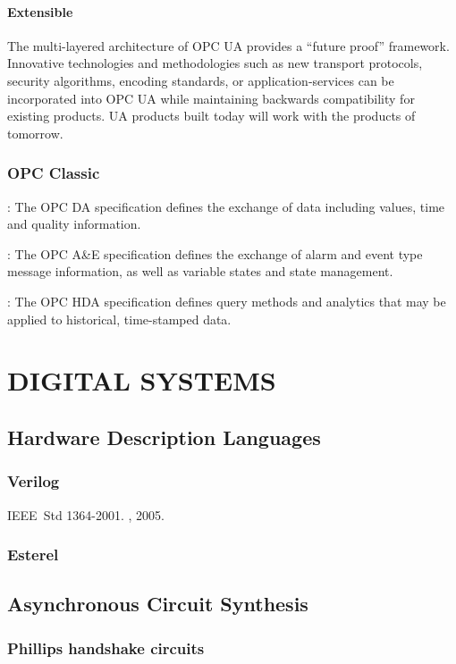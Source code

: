 \documentclass{myproc}
\begin{document}
\paragraph{Extensible}
The multi-layered architecture of OPC UA provides a ``future proof''
framework. Innovative technologies and methodologies such as new transport
protocols, security algorithms, encoding standards, or application-services
can be incorporated into OPC UA while maintaining backwards compatibility for
existing products. UA products built today will work with the products of
tomorrow. 

\subsubsection{OPC Classic}
\bit
\w {}:
The OPC DA specification defines the exchange of data including values, time and quality information.

\w {}:
The OPC A\&E specification defines the exchange of alarm and event type message
information, as well as variable states and state management. 

\w {}:
The OPC HDA specification defines query methods and analytics that may be
applied to historical, time-stamped data.
\eit


\section{DIGITAL SYSTEMS}
\subsection{Hardware Description Languages}
\subsubsection{Verilog}
\bit
\w IEEE~Std 1364-2001.
, 2005.
\eit
\subsubsection{Esterel}

\subsection{\textcolor{red2}{\bf{}Asynchronous Circuit Synthesis}}
\subsubsection{Phillips handshake circuits}
\end{document}
